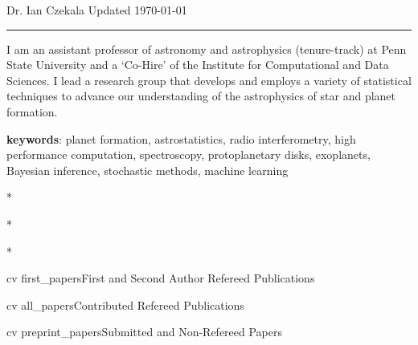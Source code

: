 \documentclass[10pt]{article}
\begin{document}
 \selectfont

{\huge \textcolor{myblue1}{Dr. Ian Czekala} } {\small \hfill Updated \today}

\rule{\textwidth}{1pt}



\vspace{12pt}

I am an assistant professor of astronomy and astrophysics (tenure-track) at Penn State University and a `Co-Hire' of the Institute for Computational and Data Sciences. I lead a research group that develops and employs a variety of statistical techniques to advance our understanding of the astrophysics of star and planet formation. 

\textbf{keywords}: planet formation, astrostatistics, radio interferometry, high performance computation, spectroscopy, protoplanetary disks, exoplanets, Bayesian inference, stochastic methods, machine learning











\nocite{first}{*}

\nocite{all}{*}

\nocite{preprint}{*}

{cv}
{first_papers}{First and Second Author Refereed Publications}

{cv}
{all_papers}{Contributed Refereed Publications}

{cv}
{preprint_papers}{Submitted and Non-Refereed Papers}






















\end{document}
